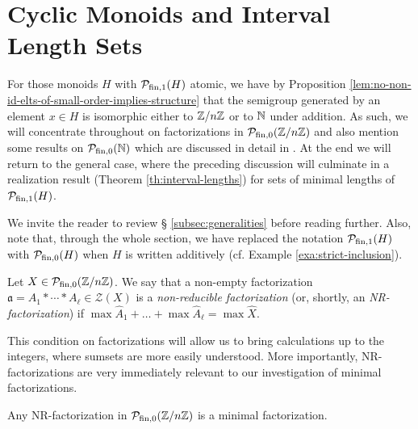 \section{Cyclic Monoids and Interval Length Sets}
\label{sec:cyclic-case} 
For those monoids $H$ with $\mathcal{P}_{\textrm{fin}, 1}(H)$ atomic, we have by Proposition \ref{lem:no-non-id-elts-of-small-order-implies-structure} that the semigroup generated by an element $x\in H$ is isomorphic either to $\mathbb{Z}/n\mathbb{Z}$ or to $\mathbb{N}$ under addition.
As such, we will concentrate throughout on factorizations in $\mathcal{P}_{\textrm{fin},0}(\mathbb{Z}/n\mathbb{Z})$ and also mention some results on $\mathcal{P}_{\textrm{fin},0}(\mathbb{N})$ which are discussed in detail in \cite[\S{ }4]{fan-tringali18}.
At the end we will return to the general case, where the preceding discussion will culminate in a realization result (Theorem \ref{th:interval-lengths}) for sets of minimal lengths of $\mathcal{P}_{\textrm{fin}, 1}(H)$.

We invite the reader to review \S{ }\ref{subsec:generalities} before reading further. Also, note that, through the whole section, we have replaced the notation $\mathcal{P}_{\textrm{fin}, 1}(H)$ with $\mathcal{P}_{\textrm{fin},0}(H)$ when $H$ is written additively (cf. Example \ref{exa:strict-inclusion}).


\begin{defn}\label{NR-factorization}
	Let $X \in \mathcal P_{\textrm{fin},0}(\mathbb{Z}/n\mathbb{Z})$. We say that a non-empty factorization $\mathfrak a = A_1 \ast \cdots \ast A_\ell \in \mathcal{Z}(X)$ is a \emph{non-reducible factorization} (or, shortly, an \emph{\textup{NR}-factorization}) if $ \max\hat{A}_1 + \dots + \max\hat{A}_\ell = \max \hat{X}$.
\end{defn}

This condition on factorizations will allow us to bring calculations up to the integers, where sumsets are more easily understood.
More importantly, NR-factorizations are very immediately relevant to our investigation of minimal factorizations.

\begin{lemma}\label{NR-factorizations-are-minimal}
Any \textup{NR}-factorization in $\mathcal{P}_{\textrm{fin},0}(\mathbb{Z}/n\mathbb{Z})$ is a minimal factorization.
\end{lemma}

